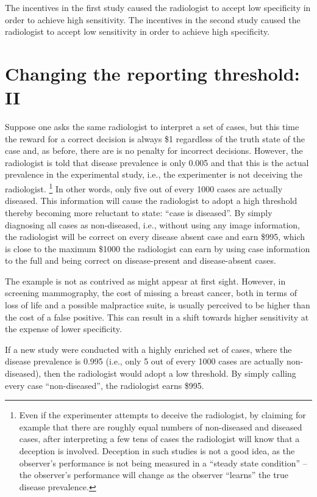\documentclass[
]{book}
\begin{document}
The incentives in the first study caused the radiologist to accept low specificity in order to achieve high sensitivity. The incentives in the second study caused the radiologist to accept low sensitivity in order to achieve high specificity.

\hypertarget{binary-task-model-example-2}{%
\section{Changing the reporting threshold: II}\label{binary-task-model-example-2}}

Suppose one asks the same radiologist to interpret a set of cases, but this time the reward for a correct decision is always \$1 regardless of the truth state of the case and, as before, there are is no penalty for incorrect decisions. However, the radiologist is told that disease prevalence is only 0.005 and that this is the actual prevalence in the experimental study, i.e., the experimenter is not deceiving the radiologist. \footnote{Even if the experimenter attempts to deceive the radiologist, by claiming for example that there are roughly equal numbers of non-diseased and diseased cases, after interpreting a few tens of cases the radiologist will know that a deception is involved. Deception in such studies is not a good idea, as the observer's performance is not being measured in a ``steady state condition'' -- the observer's performance will change as the observer ``learns'' the true disease prevalence.} In other words, only five out of every 1000 cases are actually diseased. This information will cause the radiologist to adopt a high threshold thereby becoming more reluctant to state: ``case is diseased''. By simply diagnosing all cases as non-diseased, i.e., without using any image information, the radiologist will be correct on every disease absent case and earn \$995, which is close to the maximum \$1000 the radiologist can earn by using case information to the full and being correct on disease-present and disease-absent cases.

The example is not as contrived as might appear at first sight. However, in screening mammography, the cost of missing a breast cancer, both in terms of loss of life and a possible malpractice suite, is usually perceived to be higher than the cost of a false positive. This can result in a shift towards higher sensitivity at the expense of lower specificity.

If a new study were conducted with a highly enriched set of cases, where the disease prevalence is 0.995 (i.e., only 5 out of every 1000 cases are actually non-diseased), then the radiologist would adopt a low threshold. By simply calling every case ``non-diseased'', the radiologist earns \$995.
\end{document}

